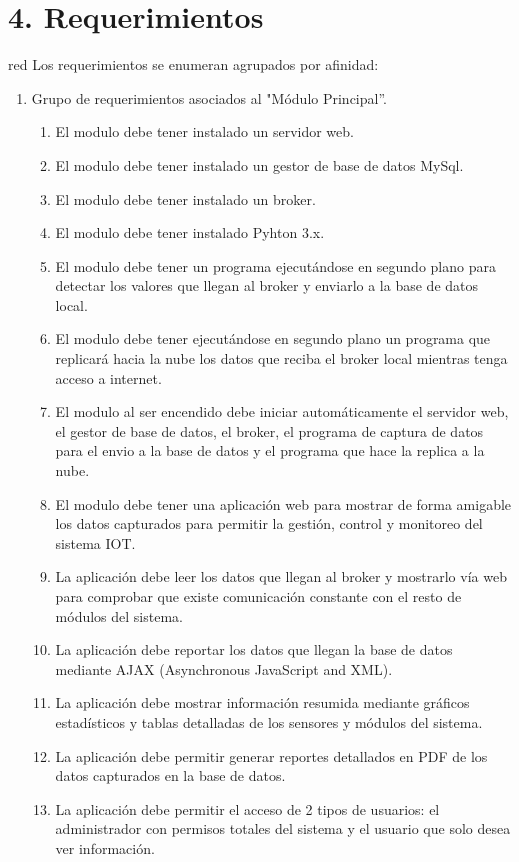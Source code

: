 \documentclass[11pt]{charter}
\begin{document}
\section{4. Requerimientos}
\label{sec:requerimientos}
\begin{consigna}{red}
Los requerimientos se enumeran agrupados por afinidad:

\begin{enumerate}
\item Grupo de requerimientos asociados al "Módulo Principal''.
	\begin{enumerate}
	\item El modulo debe tener instalado un servidor web.
	\item El modulo debe tener instalado un gestor de base de datos MySql.
	\item El modulo debe tener instalado un broker.
	\item El modulo debe tener instalado Pyhton 3.x.
	\item El modulo debe tener un programa ejecutándose en segundo plano para detectar los valores que llegan al broker y enviarlo a la base de datos local.
	\item El modulo debe tener ejecutándose en segundo plano un programa que replicará hacia la nube los datos que reciba el broker local mientras tenga acceso a internet.
	\item El modulo al ser encendido debe iniciar automáticamente el servidor web, el gestor de base de datos, el broker, el programa de captura de datos para el envio a la base de datos y el programa que hace la replica a la nube.
	\item El modulo debe tener una aplicación web para mostrar de forma amigable los datos capturados para permitir la gestión, control y monitoreo del sistema IOT.
	\item La aplicación debe leer los datos que llegan al broker y mostrarlo vía web para comprobar que existe comunicación constante con el resto de módulos del sistema.
	\item La aplicación debe reportar los datos que llegan la base de datos mediante AJAX (Asynchronous JavaScript and XML).
	\item La aplicación debe mostrar información resumida mediante gráficos estadísticos y tablas detalladas de los sensores y módulos del sistema.
	\item La aplicación debe permitir generar reportes detallados en PDF de los datos capturados en la base de datos.
	\item La aplicación debe permitir el acceso de 2 tipos de usuarios: el administrador con permisos totales del sistema y el usuario que solo desea ver información.

\end{enumerate}
\end{enumerate}
\end{consigna}
\end{document}
